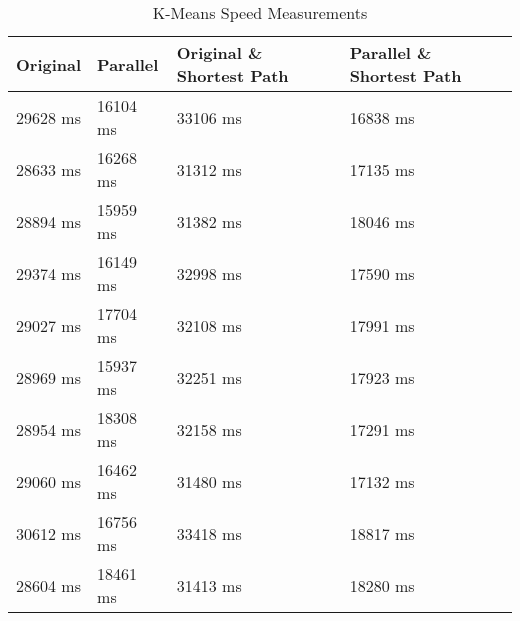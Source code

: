 \begin{table}[!hb]
    \centering
    \begin{tabular}{ | l | l | l | l | } \hline
        \textbf{Original} & \textbf{Parallel} & \textbf{Original \& Shortest Path} & \textbf{Parallel \& Shortest Path}  \\
        \hline

        29628 ms & 16104 ms & 33106 ms & 16838 ms \\
        28633 ms & 16268 ms & 31312 ms & 17135 ms \\
        28894 ms & 15959 ms & 31382 ms & 18046 ms \\
        29374 ms & 16149 ms & 32998 ms & 17590 ms \\
        29027 ms & 17704 ms & 32108 ms & 17991 ms \\
        28969 ms & 15937 ms & 32251 ms & 17923 ms \\
        28954 ms & 18308 ms & 32158 ms & 17291 ms \\
        29060 ms & 16462 ms & 31480 ms & 17132 ms \\
        30612 ms & 16756 ms & 33418 ms & 18817 ms \\
        28604 ms & 18461 ms & 31413 ms & 18280 ms \\
        \hline
    \end{tabular}
    \caption{K-Means Speed Measurements}
    \label{tab:speed_measurements_kmeans}
\end{table}

